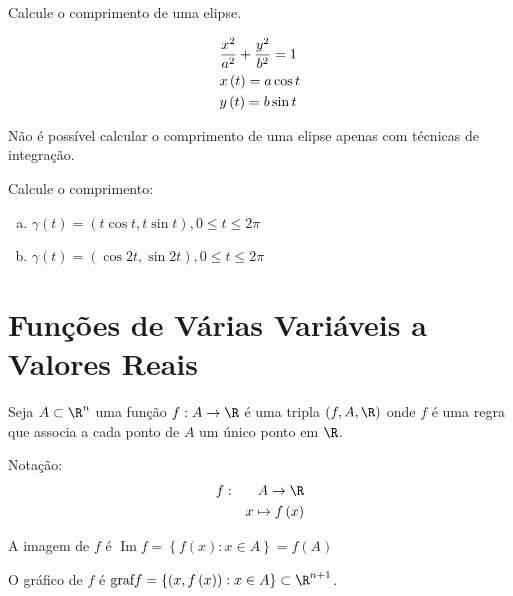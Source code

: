 \documentclass[11pt, oneside, a4paper]{gsm-l}
\begin{document}
\begin{exem}
Calcule o comprimento de uma elipse.

\end{exem}

\begin{sol}
\[
\begin{gathered}
\frac{{x^2 }}
{{a^2 }} + \frac{{y^2 }}
{{b^2 }} = 1 \hfill \\
x\left( t \right) = a\cos t \hfill \\
y\left( t \right) = b\sin t \hfill \\
\end{gathered}
\]

Não é possível calcular o comprimento de uma elipse apenas com técnicas de integração.

\end{sol}

\begin{exem}
Calcule o comprimento:

\begin{enumerate}[a)]
      \item $\gamma \left( t \right) = \left( {t\cos t,t\sin t} \right),0 \leqslant t \leqslant 2\pi$
      \item $\gamma \left( t \right) = \left( {\cos 2t,\sin 2t} \right),0 \leqslant t \leqslant 2\pi$
\end{enumerate}
\end{exem}

\newpage 

\section{Funções de Várias Variáveis a Valores Reais} \label{sec09}

\begin{defi}
    Seja $A \subset \R^n$ uma função $f:A \to \R$ é uma tripla $\left( {f,A,\R} \right)$ onde $f$ é uma regra que associa a cada ponto de $A$ um \'unico ponto em $\R$.

Notação:
\begin{eqnarray*}
f: &&A \to \R \hfill \\
&&x \mapsto f\left( x \right) \hfill \\
\end{eqnarray*}

    A imagem de $f$ é $\operatorname{Im} f = \left\{ {f\left( x \right):x \in A} \right\} = f\left( A \right)$

    O gráfico de $f$ é ${\text{graf}}f = \left\{ {\left( {x,f\left( x \right)} \right):x \in A} \right\} \subset \R^{n + 1}$.
\end{defi}
\end{document}
